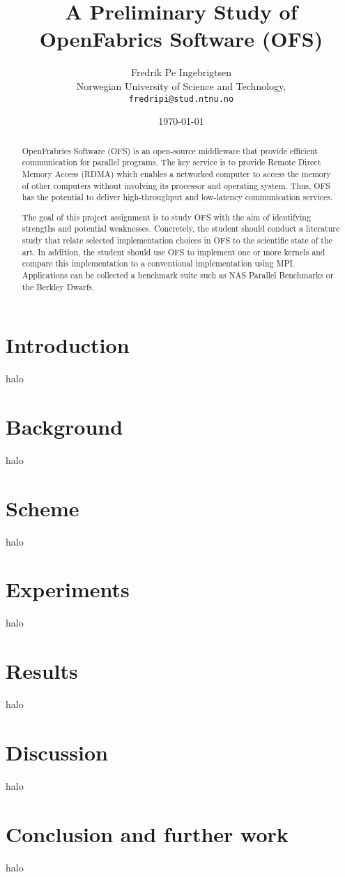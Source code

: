 \documentclass[twocolumn]{article}
\begin{document}
\title{A Preliminary Study of OpenFabrics Software (OFS)}
\author{Fredrik Pe Ingebrigtsen\\
  Norwegian University of Science and Technology,\\
  \texttt{fredripi@stud.ntnu.no}}
\date{\today}
\maketitle




\begin{abstract}
OpenFrabrics Software (OFS) is an open-source middleware that provide efficient communication for parallel programs. The key service is to provide Remote Direct Memory Access (RDMA) which enables a networked computer to access the memory of other computers without involving its processor and operating system. Thus, OFS has the potential to deliver high-throughput and low-latency communication services.

The goal of this project assignment is to study OFS with the aim of identifying strengths and potential weaknesses. Concretely, the student should conduct a literature study that relate selected implementation choices in OFS to the scientific state of the art. In addition, the student should use OFS to implement one or more kernels and compare this implementation to a conventional implementation using MPI. Applications can be collected a benchmark suite such as NAS Parallel Benchmarks or the Berkley Dwarfs.
\end{abstract}

\section{Introduction}
halo
\section{Background}
halo
\section{Scheme}
halo
\section{Experiments}
halo
\section{Results}
halo
\section{Discussion}
halo
\section{Conclusion and further work}
halo
\end{document}
